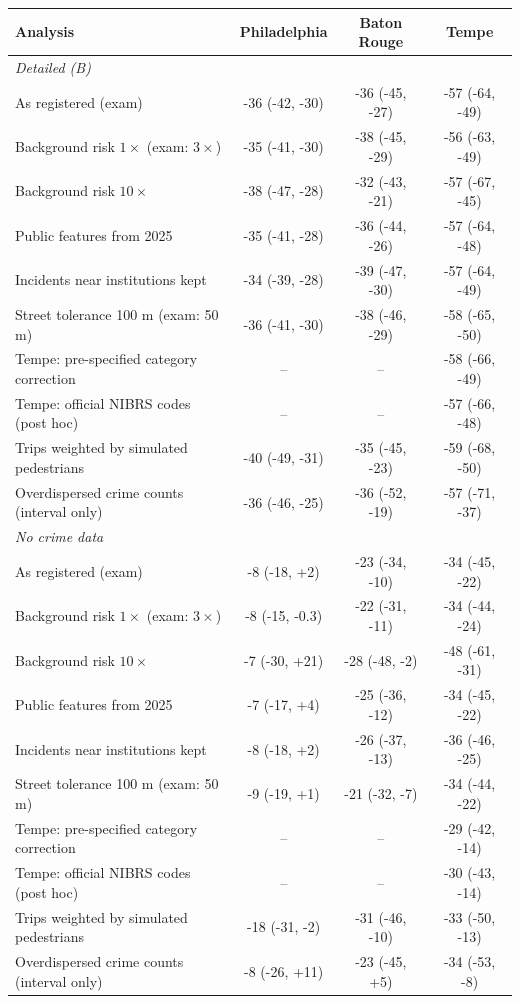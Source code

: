 \begin{tabular}{lccc}
\toprule
Analysis & Philadelphia & Baton Rouge & Tempe \\
\midrule
\multicolumn{4}{l}{\textit{Detailed (B)}} \\
\quad As registered (exam) & -36 (-42, -30) & -36 (-45, -27) & -57 (-64, -49) \\
\quad Background risk $1\times$ (exam: $3\times$) & -35 (-41, -30) & -38 (-45, -29) & -56 (-63, -49) \\
\quad Background risk $10\times$ & -38 (-47, -28) & -32 (-43, -21) & -57 (-67, -45) \\
\quad Public features from 2025 & -35 (-41, -28) & -36 (-44, -26) & -57 (-64, -48) \\
\quad Incidents near institutions kept & -34 (-39, -28) & -39 (-47, -30) & -57 (-64, -49) \\
\quad Street tolerance 100 m (exam: 50 m) & -36 (-41, -30) & -38 (-46, -29) & -58 (-65, -50) \\
\quad Tempe: pre-specified category correction & -- & -- & -58 (-66, -49) \\
\quad Tempe: official NIBRS codes (post hoc) & -- & -- & -57 (-66, -48) \\
\quad Trips weighted by simulated pedestrians & -40 (-49, -31) & -35 (-45, -23) & -59 (-68, -50) \\
\quad Overdispersed crime counts (interval only) & -36 (-46, -25) & -36 (-52, -19) & -57 (-71, -37) \\
\midrule
\multicolumn{4}{l}{\textit{No crime data}} \\
\quad As registered (exam) & -8 (-18, +2) & -23 (-34, -10) & -34 (-45, -22) \\
\quad Background risk $1\times$ (exam: $3\times$) & -8 (-15, -0.3) & -22 (-31, -11) & -34 (-44, -24) \\
\quad Background risk $10\times$ & -7 (-30, +21) & -28 (-48, -2) & -48 (-61, -31) \\
\quad Public features from 2025 & -7 (-17, +4) & -25 (-36, -12) & -34 (-45, -22) \\
\quad Incidents near institutions kept & -8 (-18, +2) & -26 (-37, -13) & -36 (-46, -25) \\
\quad Street tolerance 100 m (exam: 50 m) & -9 (-19, +1) & -21 (-32, -7) & -34 (-44, -22) \\
\quad Tempe: pre-specified category correction & -- & -- & -29 (-42, -14) \\
\quad Tempe: official NIBRS codes (post hoc) & -- & -- & -30 (-43, -14) \\
\quad Trips weighted by simulated pedestrians & -18 (-31, -2) & -31 (-46, -10) & -33 (-50, -13) \\
\quad Overdispersed crime counts (interval only) & -8 (-26, +11) & -23 (-45, +5) & -34 (-53, -8) \\
\bottomrule
\end{tabular}
